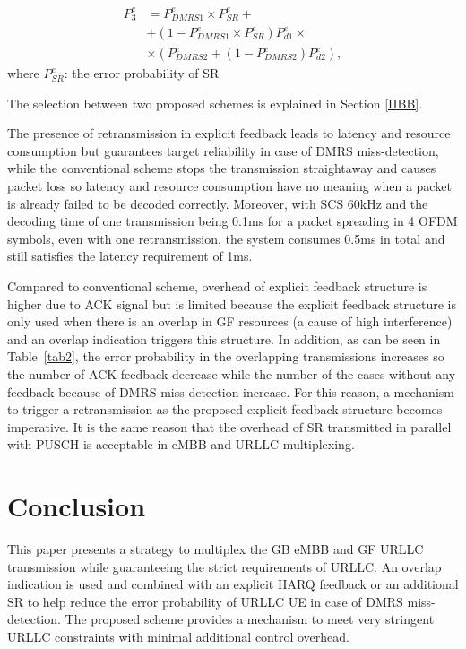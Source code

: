 \documentclass[conference]{IEEEtran}
\begin{document}
\begin{equation}
\begin{split}
 P^{e}_{3} &= P^{e}_{DMRS1}\times P^{e}_{SR} + \\
        &+ (1-P^{e}_{DMRS1}\times P^{e}_{SR})P^{e}_{d1}\times\\
        &\times(P^{e}_{DMRS2} + (1-P^{e}_{DMRS2})P^{e}_{d2}),\label{eq3}   
\end{split}
\end{equation}
where $P^{e}_{SR}$: the error probability of SR

The selection between two proposed schemes is explained in Section \ref{IIBB}.
 
The presence of retransmission in explicit feedback leads to latency and resource consumption but guarantees target reliability in case of DMRS miss-detection, while the conventional scheme stops the transmission straightaway and causes packet loss so latency and resource consumption have no meaning when a packet is already failed to be decoded correctly. Moreover, with SCS 60kHz and the decoding time of one transmission being 0.1ms for a packet spreading in 4 OFDM symbols, even with one retransmission, the system consumes 0.5ms in total and still satisfies the latency requirement of 1ms.

Compared to conventional scheme, overhead of explicit feedback structure is higher due to ACK signal but is limited because the explicit feedback structure is only used when there is an overlap in GF resources (a cause of high interference) and an overlap indication triggers this structure. In addition, as can be seen in Table~\ref{tab2}, the error probability in the overlapping transmissions increases so the number of ACK feedback decrease while the number of the cases without any feedback because of DMRS miss-detection increase. For this reason, a mechanism to trigger a retransmission as the proposed explicit feedback structure becomes imperative. It is the same reason that the overhead of SR transmitted in parallel with PUSCH is acceptable in eMBB and URLLC multiplexing.

\section{Conclusion}\label{IV}

This paper presents a strategy to multiplex the GB eMBB and GF URLLC transmission while guaranteeing the strict requirements of URLLC. An overlap indication is used and combined with an explicit HARQ feedback or an additional SR to help reduce the error probability of URLLC UE in case of DMRS miss-detection. The proposed scheme provides a mechanism to meet very stringent URLLC constraints with minimal additional control overhead.
\end{document}
